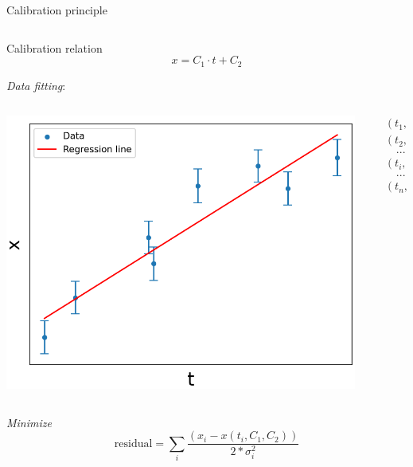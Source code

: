 \documentclass[compress, 13pt, aspectratio=169]{beamer}
\begin{document}
\begin{frame}[fragile,t]{Calibration principle}
	\vspace*{-2em}
	\begin{columns}[t]
		\begin{column}{0.45 \textwidth}
			\begin{block}{\small Calibration relation}
				$$x = C_1 \cdot t + C_2$$
			\end{block}
			\textit{\footnotesize Data fitting}:
			\begin{columns}
				\begin{column}{0.6 \textwidth}
					\includegraphics[keepaspectratio, height = 0.4\textheight]{fitting_plot.png}
				\end{column}
				\begin{column}{0.4 \textwidth}
					\small
					\vspace*{-1em}
					\begin{align*}
						 & (t_1,\  x_1) \\
						 & (t_2,\  x_2) \\
						 & \quad ...    \\
						 & (t_i,\  x_i) \\
						 & \quad ...    \\
						 & (t_n,\  x_n)
					\end{align*}
				\end{column}
			\end{columns}
			\vspace{0.3cm}
			\footnotesize{
				\textit{Minimize}
				$$ \text{residual}= \sum_i \frac{(x_i - x(t_i, C_1, C_2))}{ 2* \sigma_i^2} $$
}
\end{column}
\end{columns}
\end{frame}
\end{document}
